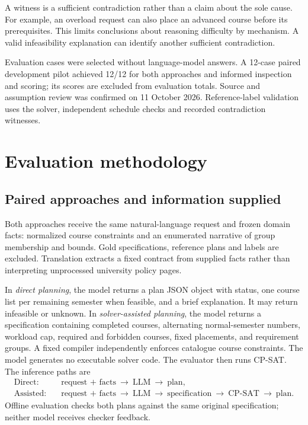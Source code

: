 \documentclass[11pt,a4paper]{article}
\begin{document}
A witness is a sufficient contradiction rather than a claim about the sole
cause. For example, an overload request can also place an advanced course
before its prerequisites. This limits conclusions about reasoning difficulty
by mechanism. A valid infeasibility explanation can identify another sufficient
contradiction.

Evaluation cases were selected without language-model answers. A 12-case
paired development pilot achieved 12/12 for both approaches and informed
inspection and scoring; its scores are excluded from evaluation totals.
Source and assumption review was confirmed on 11 October 2026.
Reference-label validation uses the solver, independent
schedule checks and recorded contradiction witnesses.

\par
\section{Evaluation methodology}
\subsection{Paired approaches and information supplied}
Both approaches receive the same natural-language request and frozen domain
facts: normalized course constraints and an enumerated narrative of group
membership and bounds. Gold specifications, reference plans and labels are
excluded. Translation extracts a fixed contract from supplied facts rather
than interpreting unprocessed university policy pages.

In \emph{direct planning}, the model returns a plan JSON object with status,
one course list per remaining semester when feasible, and a brief explanation.
It may return infeasible or unknown. In \emph{solver-assisted planning}, the
model returns a specification containing completed courses, alternating
normal-semester numbers, workload cap, required and forbidden courses, fixed
placements, and requirement groups. A fixed compiler independently enforces
catalogue course constraints. The model generates no executable solver code.
The evaluator then runs CP-SAT. The inference paths are
\[
\begin{aligned}
\text{Direct:}\quad & \text{request + facts}\ \to\ \text{LLM}\ \to\ \text{plan},\\
\text{Assisted:}\quad & \text{request + facts}\ \to\ \text{LLM}\ \to\
\text{specification}\ \to\ \text{CP-SAT}\ \to\ \text{plan}.
\end{aligned}
\]
Offline evaluation checks both plans against the same original specification;
neither model receives checker feedback.
\end{document}
